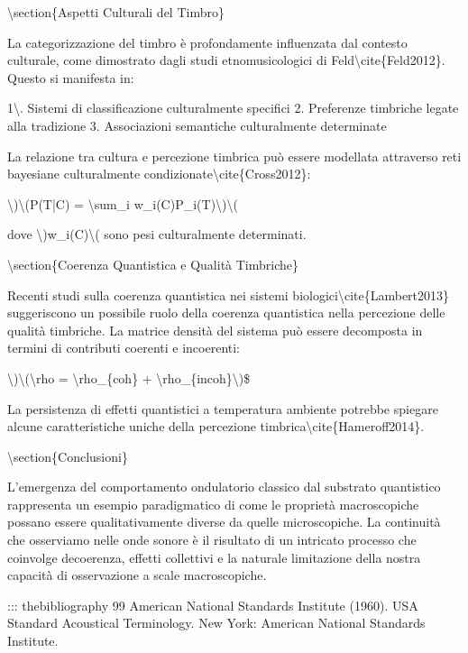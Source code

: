 \documentclass[a4paper,11pt]{article}
\begin{document}
\textbackslash{}section\{Aspetti Culturali del Timbro\}

La categorizzazione del timbro \`e profondamente influenzata dal contesto
culturale, come dimostrato dagli studi etnomusicologici di
Feld\textbackslash{}cite\{Feld2012\}. Questo si manifesta in:

1\textbackslash{}. Sistemi di classificazione culturalmente specifici 2. Preferenze
timbriche legate alla tradizione 3. Associazioni semantiche
culturalmente determinate

La relazione tra cultura e percezione timbrica pu\`o essere modellata
attraverso reti bayesiane culturalmente condizionate\textbackslash{}cite\{Cross2012\}:

\textbackslash{})\textbackslash{}(P(T|C) = \textbackslash{}sum\_i w\_i(C)P\_i(T)\textbackslash{})\textbackslash{}(

dove \textbackslash{})w\_i(C)\textbackslash{}( sono pesi culturalmente determinati.

\textbackslash{}section\{Coerenza Quantistica e Qualit\`a Timbriche\}

Recenti studi sulla coerenza quantistica nei sistemi
biologici\textbackslash{}cite\{Lambert2013\} suggeriscono un possibile ruolo della coerenza
quantistica nella percezione delle qualit\`a timbriche. La matrice densit\`a
del sistema pu\`o essere decomposta in termini di contributi coerenti e
incoerenti:

\textbackslash{})\textbackslash{}(\textbackslash{}rho = \textbackslash{}rho\_\{coh\} + \textbackslash{}rho\_\{incoh\}\textbackslash{})\$

La persistenza di effetti quantistici a temperatura ambiente potrebbe
spiegare alcune caratteristiche uniche della percezione
timbrica\textbackslash{}cite\{Hameroff2014\}.

\textbackslash{}section\{Conclusioni\}

L'emergenza del comportamento ondulatorio classico dal substrato
quantistico rappresenta un esempio paradigmatico di come le propriet\`a
macroscopiche possano essere qualitativamente diverse da quelle
microscopiche. La continuit\`a che osserviamo nelle onde sonore \`e il
risultato di un intricato processo che coinvolge decoerenza, effetti
collettivi e la naturale limitazione della nostra capacit\`a di
osservazione a scale macroscopiche.

::: thebibliography
99 American National Standards Institute (1960). USA Standard Acoustical
Terminology. New York: American National Standards Institute.
\end{document}
